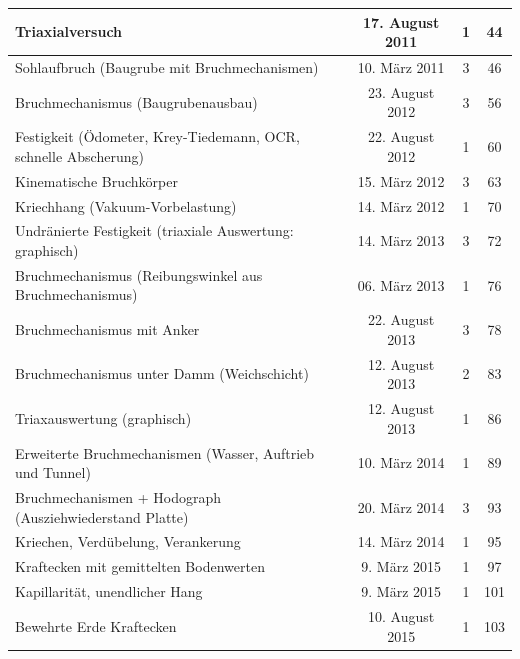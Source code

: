 \documentclass[fleqn,twoside]{article}
\begin{document}
\begin{table}[hbt!]
\begin{tabular}{@{}|l|c|c|c|@{}}
Triaxialversuch                                            & 17. August 2011  & 1            & 44          \\ \midrule
Sohlaufbruch (Baugrube mit Bruchmechanismen)               & 10. März 2011    & 3            & 46          \\ \midrule
Bruchmechanismus (Baugrubenausbau)                         & 23. August 2012  & 3            & 56          \\ \midrule
Festigkeit (Ödometer, Krey-Tiedemann, OCR, schnelle Abscherung)   & 22. August 2012 & 1 & 60               \\ \midrule
Kinematische Bruchkörper                                   & 15. März 2012    & 3            & 63          \\ \midrule
Kriechhang (Vakuum-Vorbelastung)                           & 14. März 2012    & 1            & 70          \\ \midrule
Undränierte Festigkeit (triaxiale Auswertung: graphisch)   & 14. März 2013    & 3            & 72          \\ \midrule
Bruchmechanismus (Reibungswinkel aus Bruchmechanismus)     & 06. März 2013    & 1            & 76          \\ \midrule
Bruchmechanismus mit Anker                                 & 22. August 2013  & 3            & 78          \\ \midrule
Bruchmechanismus unter Damm (Weichschicht)                 & 12. August 2013  & 2            & 83          \\ \midrule
Triaxauswertung (graphisch)                                & 12. August 2013  & 1            & 86          \\ \midrule
Erweiterte Bruchmechanismen (Wasser, Auftrieb und Tunnel)  & 10. März 2014    & 1            & 89          \\ \midrule
Bruchmechanismen + Hodograph (Ausziehwiederstand Platte)   & 20. März 2014    & 3            & 93          \\ \midrule
Kriechen, Verdübelung, Verankerung                         & 14. März 2014    & 1            & 95          \\ \midrule
Kraftecken mit gemittelten Bodenwerten                     & 9. März 2015     & 1            & 97          \\ \midrule
Kapillarität, unendlicher Hang                             & 9. März 2015     & 1            & 101         \\ \midrule
Bewehrte Erde Kraftecken                                   & 10. August 2015  & 1            & 103         \\ \midrule

\end{tabular}
\end{table}
\end{document}
